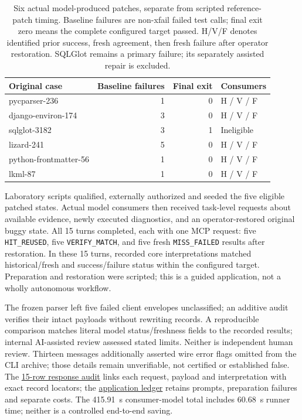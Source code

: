 \documentclass[preprint,12pt,a4paper]{elsarticle}
\newcommand{\code}[1]{\texttt{#1}}
\begin{document}
\begin{table}[htbp]\centering\small
\begin{tabular}{@{}lrrl@{}}\toprule
Original case & Baseline failures & Final exit & Consumers \\
\midrule
pycparser-236 & 1 & 0 & H / V / F \\
django-environ-174 & 3 & 0 & H / V / F \\
sqlglot-3182 & 3 & 1 & Ineligible \\
lizard-241 & 5 & 0 & H / V / F \\
python-frontmatter-56 & 1 & 0 & H / V / F \\
lkml-87 & 1 & 0 & H / V / F \\
\bottomrule\end{tabular}
\caption{Six actual model-produced patches, separate from scripted reference-patch timing. Baseline failures are non-xfail failed test calls; final exit zero means the complete configured target passed. H/V/F denotes identified prior success, fresh agreement, then fresh failure after operator restoration. SQLGlot remains a primary failure; its separately assisted repair is excluded.}
\label{tab:actual-cases}\end{table}

Laboratory scripts qualified, externally authorized and seeded the five eligible patched states. Actual model consumers then received task-level requests about available evidence, newly executed diagnostics, and an operator-restored original buggy state. All 15 turns completed, each with one MCP request: five \code{HIT\_REUSED}, five \code{VERIFY\_MATCH}, and five fresh \code{MISS\_FAILED} results after restoration. In these 15 turns, recorded core interpretations matched historical/fresh and success/failure status within the configured target. Preparation and restoration were scripted; this is a guided application, not a wholly autonomous workflow.

The frozen parser left five failed client envelopes unclassified; an additive audit verifies their intact payloads without rewriting records. A reproducible comparison matches literal model status/freshness fields to the recorded results; internal AI-assisted review assessed stated limits. Neither is independent human review. Thirteen messages additionally asserted wire error flags omitted from the CLI archive; those details remain unverifiable, not certified or established false. The \href{https://github.com/floxy-21/zerorun-research/blob/6a2aab778a290102dbe4c8652eefb3310d15d1e0/research/softwarex/CONSUMER_LIZARD_AUDIT.md}{15-row response audit} links each request, payload and interpretation with exact record locators; the \href{https://github.com/floxy-21/zerorun-research/blob/6a2aab778a290102dbe4c8652eefb3310d15d1e0/research/softwarex/REAL_AGENT_APPLICATION_053_RESULTS.md}{application ledger} retains prompts, preparation failures and separate costs. The 415.91~s consumer-model total includes 60.68~s runner time; neither is a controlled end-to-end saving.
\end{document}
